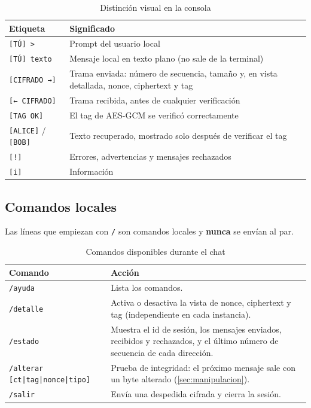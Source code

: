 \documentclass[11pt,a4paper]{article}
\theoremstyle{definition}
\theoremstyle{remark}
\newcommand{\code}[1]{\texttt{#1}}
\begin{document}
\begin{table}[H]
  \centering
  \caption{Distinción visual en la consola}
  \label{tab:consola}
  \small
  \begin{tabularx}{\linewidth}{@{}l Y@{}}
    \toprule
    \textbf{Etiqueta} & \textbf{Significado} \\
    \midrule
    \code{[TÚ] > }            & Prompt del usuario local \\
    \code{[TÚ] texto}         & Mensaje local en texto plano (no sale de la terminal) \\
    \code{[CIFRADO →]}        & Trama enviada: número de secuencia, tamaño y, en vista detallada, nonce, ciphertext y tag \\
    \code{[← CIFRADO]}        & Trama recibida, antes de cualquier verificación \\
    \code{[TAG OK]}           & El tag de AES-GCM se verificó correctamente \\
    \code{[ALICE]} / \code{[BOB]} & Texto recuperado, mostrado solo después de verificar el tag \\
    \code{[!]}                & Errores, advertencias y mensajes rechazados \\
    \code{[i]}                & Información \\
    \bottomrule
  \end{tabularx}
\end{table}

\subsection{Comandos locales}
\label{subsec:comandos}

Las líneas que empiezan con \code{/} son comandos locales y \textbf{nunca}
se envían al par.

\begin{table}[H]
  \centering
  \caption{Comandos disponibles durante el chat}
  \label{tab:comandos}
  \small
  \begin{tabularx}{\linewidth}{@{}l Y@{}}
    \toprule
    \textbf{Comando} & \textbf{Acción} \\
    \midrule
    \code{/ayuda}   & Lista los comandos. \\
    \code{/detalle} & Activa o desactiva la vista de nonce, ciphertext y tag (independiente en cada instancia). \\
    \code{/estado}  & Muestra el id de sesión, los mensajes enviados, recibidos y rechazados, y el último número de secuencia de cada dirección. \\
    \code{/alterar [ct|tag|nonce|tipo]} & Prueba de integridad: el próximo mensaje sale con un byte alterado (\cref{sec:manipulacion}). \\
    \code{/salir}   & Envía una despedida cifrada y cierra la sesión. \\
    \bottomrule
  \end{tabularx}
\end{table}
\end{document}
